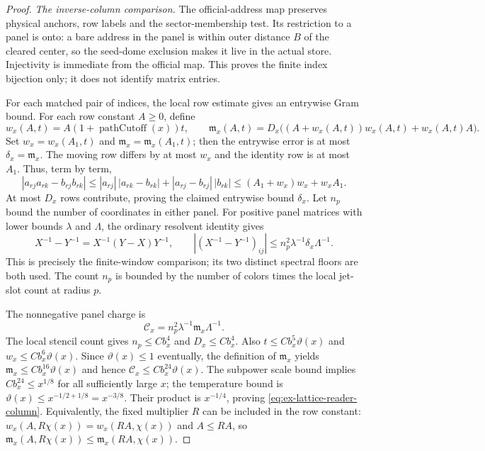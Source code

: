 \begin{proof}
\emph{The inverse-column comparison.}
The official-address map preserves physical anchors, row labels and
the sector-membership test.  Its restriction to a panel is onto: a
bare address in the panel is within outer distance $B$ of the cleared
center, so the seed-dome exclusion makes it live in the actual store.
Injectivity is immediate from the official map.  This proves the
finite index bijection only; it does not identify matrix entries.

For each matched pair of indices, the local row estimate gives an
entrywise Gram bound.  For each row constant $A\ge0$, define
\[
 w_x(A,t)=A(1+\operatorname{pathCutoff}(x))t,\qquad
 \mathfrak m_x(A,t)=D_x\bigl((A+w_x(A,t))w_x(A,t)
                                  +w_x(A,t)A\bigr).
\]
Set $w_x=w_x(A_1,t)$ and $\mathfrak m_x=\mathfrak m_x(A_1,t)$;
then the entrywise error is at most $\delta_x=\mathfrak m_x$.
The moving row differs by at most $w_x$ and the identity row is at
most $A_1$.  Thus, term by term,
\[
 |a_{rj}a_{rk}-b_{rj}b_{rk}|
 \le |a_{rj}|\,|a_{rk}-b_{rk}|
      +|a_{rj}-b_{rj}|\,|b_{rk}|
 \le (A_1+w_x)w_x+w_xA_1.
\]
At most $D_x$ rows contribute, proving the claimed entrywise bound
$\delta_x$.  Let $n_p$ bound the number of coordinates in either
panel.  For positive panel matrices with lower bounds $\lambda$ and
 $\Lambda$, the ordinary resolvent identity gives
\[
 X^{-1}-Y^{-1}=X^{-1}(Y-X)Y^{-1},\qquad
 |(X^{-1}-Y^{-1})_{ij}|
       \le n_p^2\lambda^{-1}\delta_x\Lambda^{-1}.
\]
This is precisely the finite-window comparison; its two distinct
spectral floors are both used.  The count $n_p$ is bounded by the
number of colors times the local jet-slot count at radius $p$.

The nonnegative panel charge is
\[
 \mathcal C_x=n_p^2\lambda^{-1}\mathfrak m_x\Lambda^{-1}.
\]
The local stencil count gives $n_p\le Cb_x^4$ and $D_x\le Cb_x^4$.
Also $t\le Cb_x^5\vartheta(x)$ and
$w_x\le Cb_x^6\vartheta(x)$.  Since $\vartheta(x)\le1$ eventually,
the definition of $\mathfrak m_x$ yields
$\mathfrak m_x\le Cb_x^{16}\vartheta(x)$ and hence
$\mathcal C_x\le Cb_x^{24}\vartheta(x)$.  The subpower scale bound
implies $Cb_x^{24}\le x^{1/8}$ for all sufficiently large $x$; the
temperature bound is $\vartheta(x)\le x^{-1/2+1/8}=x^{-3/8}$.
Their product is $x^{-1/4}$, proving
\eqref{eq:ex-lattice-reader-column}. Equivalently, the fixed multiplier
$R$ can be included in the row constant: $w_x(A,R\chi(x))=w_x(RA,\chi(x))$
and $A\le RA$, so
$\mathfrak m_x(A,R\chi(x))\le\mathfrak m_x(RA,\chi(x))$.
\end{proof}
